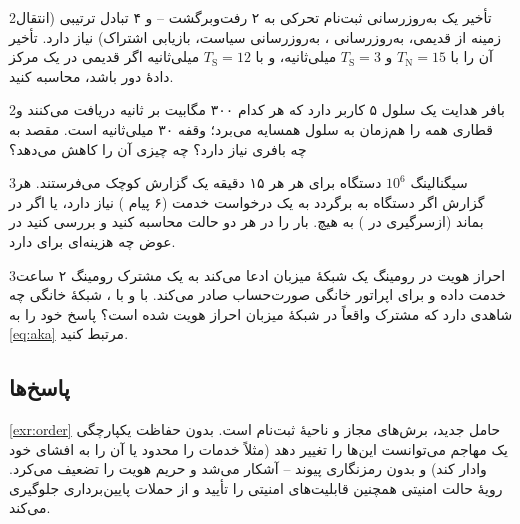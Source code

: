 \documentclass[11pt,a4paper]{article}
\begin{document}
\begin{exercisebox}{2}{تأخیر}\label{exr:latency}
یک به‌روزرسانی ثبت‌نام تحرکی به ۲ رفت‌وبرگشت -- و ۴ تبادل ترتیبی  (انتقال زمینه از  قدیمی،
به‌روزرسانی ، به‌روزرسانی سیاست، بازیابی اشتراک) نیاز دارد. تأخیر آن را با $T_{\mathrm{N}} = 15$ و $T_{\mathrm{S}} = 3$
میلی‌ثانیه، و با $T_{\mathrm{S}} = 12$ میلی‌ثانیه اگر  قدیمی در یک مرکز دادهٔ دور باشد، محاسبه کنید.
\end{exercisebox}

\begin{exercisebox}{2}{بافر هدایت}\label{exr:fwd}
یک سلول ۵ کاربر دارد که هر کدام ۳۰۰ مگابیت بر ثانیه دریافت می‌کنند و قطاری همه را هم‌زمان به سلول همسایه می‌برد؛ وقفه ۳۰ میلی‌ثانیه
است.  مقصد به چه بافری نیاز دارد؟ چه چیزی آن را کاهش می‌دهد؟
\end{exercisebox}

\begin{exercisebox}{3}{سیگنالینگ }\label{exr:iot}
$10^6$ دستگاه  برای هر  هر ۱۵ دقیقه یک گزارش کوچک می‌فرستند. هر گزارش اگر دستگاه به  برگردد به یک
درخواست خدمت (۶ پیام ) نیاز دارد، یا اگر در  بماند (ازسرگیری در ) به هیچ. بار  را در
هر دو حالت محاسبه کنید و بررسی کنید  در عوض چه هزینه‌ای برای  دارد.
\end{exercisebox}

\begin{exercisebox}{3}{احراز هویت در رومینگ}\label{exr:roam}
یک شبکهٔ میزبان ادعا می‌کند به یک مشترک رومینگ ۲ ساعت خدمت داده و برای اپراتور خانگی صورت‌حساب صادر می‌کند. با  و با
، شبکهٔ خانگی چه شاهدی دارد که مشترک واقعاً در شبکهٔ میزبان احراز هویت شده است؟ پاسخ خود را به \cref{eq:aka} مرتبط کنید.
\end{exercisebox}

\subsection*{پاسخ‌ها}

\begin{solutionbox}{\ref{exr:order}}
 حامل  جدید، برش‌های مجاز و ناحیهٔ ثبت‌نام است. بدون حفاظت یکپارچگی یک مهاجم می‌توانست این‌ها
را تغییر دهد (مثلاً خدمات  را محدود یا آن را به افشای خود وادار کند) و بدون رمزنگاری پیوند -- آشکار
می‌شد و حریم هویت را تضعیف می‌کرد. رویهٔ حالت امنیتی همچنین قابلیت‌های امنیتی  را تأیید و از حملات پایین‌برداری جلوگیری
می‌کند.
\end{solutionbox}
\end{document}
